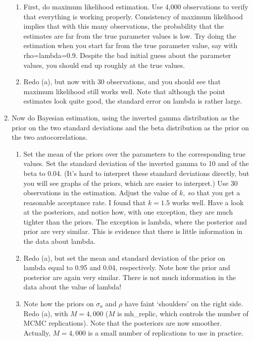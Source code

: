 \documentclass[12pt,thmsa]{article}
\begin{document}
\begin{enumerate}
\begin{enumerate}
\item First, do maximum likelihood estimation. Use 4,000 observations to
verify that everything is working properly. Consistency of maximum
likelihood implies that with this many observations, the probability that
the estimates are far from the true parameter values is low. Try doing the
estimation when you start far from the true parameter value, say with
rho=lambda=0.9. Despite the bad initial guess about the parameter values,
you should end up roughly at the true values.

\item Redo (a), but now with 30 observations, and you should see that
maximum likelihood still works well. Note that although the point estimates
look quite good, the standard error on lambda is rather large.
\end{enumerate}

\item Now do Bayesian estimation, using the inverted gamma distribution as
the prior on the two standard deviations and the beta distribution as the
prior on the two autocorrelations.

\begin{enumerate}
\item Set the mean of the priors over the parameters to the corresponding
true values. Set the standard deviation of the inverted gamma to 10 and of
the beta to 0.04. (It's hard to interpret these standard deviations
directly, but you will see graphs of the priors, which are easier to
interpret.) Use 30 observations in the estimation. Adjust the value of $k,$
so that you get a reasonable acceptance rate. I found that $k=1.5$ works
well. Have a look at the posteriors, and notice how, with one exception,
they are much tighter than the priors. The exception is lambda, where the
posterior and prior are very similar. This is evidence that there is little
information in the data about lambda.

\item Redo (a), but set the mean and standard deviation of the prior on
lambda equal to 0.95 and 0.04, respectively. Note how the prior and
posterior are again very similar. There is not much information in the data
about the value of lambda!

\item Note how the priors on $\sigma _{a}$ and $\rho $ have faint
`shoulders' on the right side. Redo (a), with $M=4,000$ ($M$ is mh\_replic,
which controls the number of MCMC replications). Note that the posteriors
are now smoother. Actually, $M=4,000$ is a small number of replications to
use in practice.


\end{enumerate}
\end{enumerate}
\end{document}
